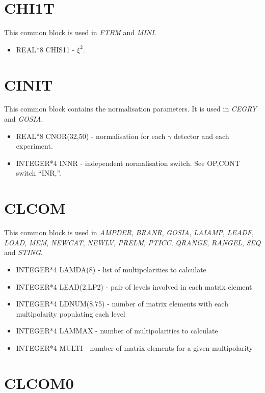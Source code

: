 \section{CHI1T}

This common block is used in \emph{FTBM} and \emph{MINI}.

\begin{itemize}
\item REAL*8 CHIS11 - $\xi^2$.
\end{itemize}

\section{CINIT}

This common block contains the normalisation parameters. It is used in \emph{
CEGRY} and \emph{GOSIA}.

\begin{itemize}
\item REAL*8 CNOR(32,50) - normalisation for each $\gamma$ detector and each
experiment.
\item INTEGER*4 INNR - independent normalisation switch. See OP,CONT switch
``INR,''.
\end{itemize}

\section{CLCOM}

This common block is used in \emph{AMPDER}, \emph{BRANR}, \emph{GOSIA}, \emph{
LAIAMP}, \emph{LEADF}, \emph{LOAD}, \emph{MEM}, \emph{NEWCAT}, \emph{NEWLV}, \emph{
PRELM}, \emph{PTICC}, \emph{QRANGE}, \emph{RANGEL}, \emph{SEQ} and \emph{STING}.

\begin{itemize}
\item INTEGER*4 LAMDA(8) - list of multipolarities to calculate
\item INTEGER*4 LEAD(2,LP2) - pair of levels involved in each matrix element
\item INTEGER*4 LDNUM(8,75) - number of matrix elements with each multipolarity populating each level
\item INTEGER*4 LAMMAX - number of multipolarities to calculate
\item INTEGER*4 MULTI - number of matrix elements for a given multipolarity
\end{itemize}

\section{CLCOM0}

